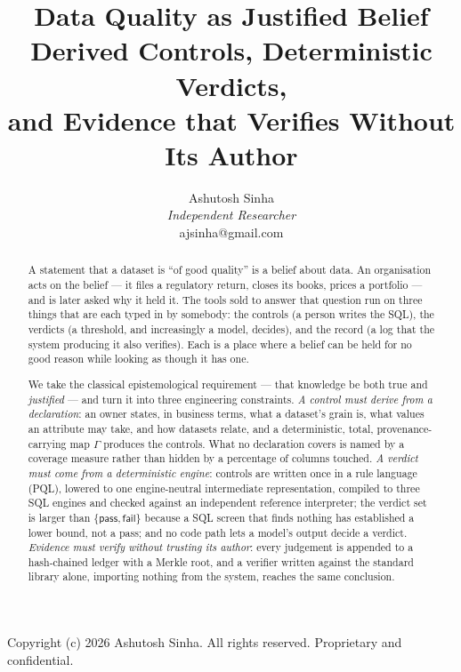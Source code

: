 \documentclass[11pt,a4paper]{article}
\title{\bfseries Data Quality as Justified Belief\\[6pt]
{\large Derived Controls, Deterministic Verdicts,\\
and Evidence that Verifies Without Its Author}}
\author{Ashutosh Sinha\\[2pt]
{\normalsize\itshape Independent Researcher}\\[2pt]
{\normalsize\ttfamily ajsinha@gmail.com}}
\date{}
\renewcommand{\_}{\oldunderscore\allowbreak}
\theoremstyle{plain}
\theoremstyle{definition}
\theoremstyle{remark}
\newcommand{\PASS}{\textsf{pass}}
\newcommand{\FAIL}{\textsf{fail}}
\newcommand{\Gam}{\Gamma}
\begin{document}
\maketitle

\begin{center}
\footnotesize Copyright (c) 2026 Ashutosh Sinha. All rights reserved. Proprietary and confidential.
\end{center}

\begin{abstract}
\noindent
A statement that a dataset is ``of good quality'' is a belief about data. An organisation acts on the
belief --- it files a regulatory return, closes its books, prices a portfolio --- and is later asked why it
held it. The tools sold to answer that question run on three things that are each typed in by somebody: the
controls (a person writes the SQL), the verdicts (a threshold, and increasingly a model, decides), and the
record (a log that the system producing it also verifies). Each is a place where a belief can be held for
no good reason while looking as though it has one.

We take the classical epistemological requirement --- that knowledge be both true and \emph{justified} --- and
turn it into three engineering constraints. \emph{A control must derive from a declaration}: an owner states,
in business terms, what a dataset's grain is, what values an attribute may take, and how datasets relate,
and a deterministic, total, provenance-carrying map $\Gam$ produces the controls. What no declaration
covers is named by a coverage measure rather than hidden by a percentage of columns touched. \emph{A verdict
must come from a deterministic engine}: controls are written once in a rule language (PQL), lowered to one
engine-neutral intermediate representation, compiled to three SQL engines and checked against an
independent reference interpreter; the verdict set is larger than $\{\PASS,\FAIL\}$ because a SQL screen
that finds nothing has established a lower bound, not a pass; and no code path lets a model's output decide
a verdict. \emph{Evidence must verify without trusting its author}: every judgement is appended to a
hash-chained ledger with a Merkle root, and a verifier written against the standard library alone,
importing nothing from the system, reaches the same conclusion.


\end{abstract}
\end{document}
